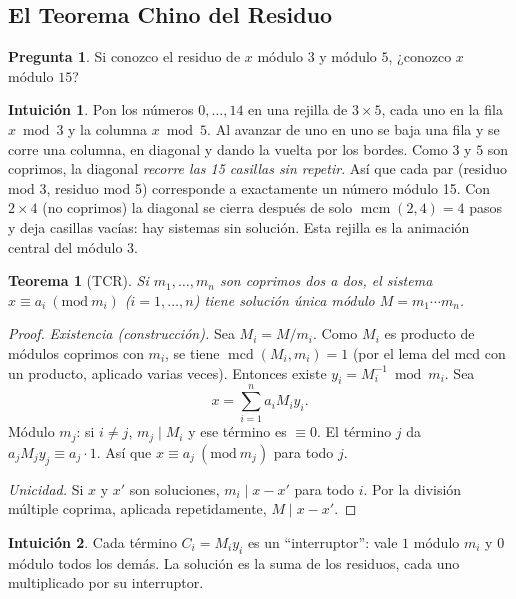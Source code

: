 \documentclass[11pt,a4paper]{article}
\newtheorem{teorema}{Teorema}[section]
\theoremstyle{definition}
\newcommand{\md}[1]{\ (\mathrm{mod}\ #1)}
\newcommand{\mcd}{\operatorname{mcd}}
\newcommand{\mcm}{\operatorname{mcm}}
\theoremstyle{notait}
\newtheorem*{pregunta}{Pregunta}
\theoremstyle{nota}
\newtheorem*{intuicion}{Intuición}
\begin{document}
\subsection{El Teorema Chino del Residuo}

\begin{pregunta}
Si conozco el residuo de $x$ módulo $3$ y módulo $5$, ¿conozco $x$ módulo $15$?
\end{pregunta}

\begin{intuicion}
Pon los números $0,\dots,14$ en una rejilla de $3\times5$, cada uno en la fila $x\bmod3$ y la columna $x\bmod 5$. Al avanzar de uno en uno se baja una fila y se corre una columna, en diagonal y dando la vuelta por los bordes. Como $3$ y $5$ son coprimos, la diagonal \emph{recorre las 15 casillas sin repetir}. Así que cada par (residuo mod 3, residuo mod 5) corresponde a exactamente un número módulo 15. Con $2\times4$ (no coprimos) la diagonal se cierra después de solo $\mcm(2,4)=4$ pasos y deja casillas vacías: hay sistemas sin solución. Esta rejilla es la animación central del módulo 3.
\end{intuicion}

\begin{teorema}[TCR]
Si $m_1,\dots,m_n$ son coprimos dos a dos, el sistema $x\equiv a_i\md{m_i}$ ($i=1,\dots,n$) tiene solución única módulo $M=m_1\cdots m_n$.
\end{teorema}

\begin{proof}
\emph{Existencia (construcción).} Sea $M_i=M/m_i$. Como $M_i$ es producto de módulos coprimos con $m_i$, se tiene $\mcd(M_i,m_i)=1$ (por el lema del mcd con un producto, aplicado varias veces). Entonces existe $y_i=M_i^{-1}\bmod m_i$. Sea
\[ x=\sum_{i=1}^n a_iM_iy_i. \]
Módulo $m_j$: si $i\ne j$, $m_j\mid M_i$ y ese término es $\equiv0$. El término $j$ da $a_jM_jy_j\equiv a_j\cdot1$. Así que $x\equiv a_j\md{m_j}$ para todo $j$.

\emph{Unicidad.} Si $x$ y $x'$ son soluciones, $m_i\mid x-x'$ para todo $i$. Por la división múltiple coprima, aplicada repetidamente, $M\mid x-x'$.
\end{proof}

\begin{intuicion}
Cada término $C_i=M_iy_i$ es un ``interruptor'': vale $1$ módulo $m_i$ y $0$ módulo todos los demás. La solución es la suma de los residuos, cada uno multiplicado por su interruptor.
\end{intuicion}
\end{document}
